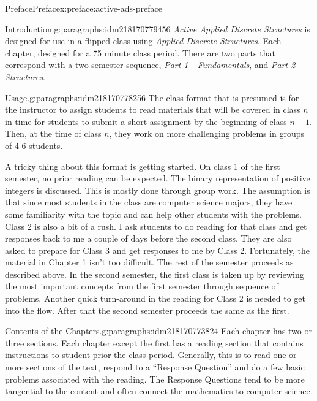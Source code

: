 \documentclass[oneside,10pt,]{book}
\numberwithin{equation}{section}
\begin{document}
\begin{preface}{Preface}{}{Preface}{}{}{x:preface:active-ads-preface}
\begin{paragraphs}{Introduction.}{g:paragraphs:idm218170779456}%
\emph{Active Applied Discrete Structures} is designed for use in a flipped class using \emph{Applied Discrete Structures}. Each chapter, designed for a 75 minute class period.  There are two parts that correspond with a two semester sequence, \emph{Part 1 - Fundamentals}, and \emph{Part 2 - Structures}.%
\end{paragraphs}%
\begin{paragraphs}{Usage.}{g:paragraphs:idm218170778256}%
The class format that is presumed is for the instructor to assign students to read materials that will be covered in class \(n\) in time for students to submit a short assignment by the beginning of class \(n-1\). Then, at the time of class \(n\), they work on more challenging problems in groups of 4-6 students.%
\par
A tricky thing about this format is getting started. On class 1 of the first semester, no prior reading can be expected. The binary representation of positive integers is discussed. This is mostly done through group work. The assumption is that since most students in the class are computer science majors, they have some familiarity with the topic and can help  other students with the problems. Class 2 is also a bit of a rush. I ask students to do reading for that class and get responses back to me a couple of days before the second class. They are also asked to prepare for Class 3 and get responses to me by Class 2.   Fortunately, the material in Chapter 1 isn't too difficult.  The rest of the semester proceeds as described above. In the second semester, the first class is taken up by reviewing the most important concepts from the first semester through sequence of problems. Another quick turn-around in the reading for Class 2 is needed to get into the flow.  After that the second semester proceeds the same as the first.%
\end{paragraphs}%
\begin{paragraphs}{Contents of the Chapters.}{g:paragraphs:idm218170773824}%
Each chapter has two or three sections.  Each chapter except the first has a reading section that contains instructions to student prior the class period. Generally, this is to read one or more sections of the text, respond to a ``Response Question'' and do a few basic problems associated with the reading.  The Response Questions tend to be more tangential to the content and often connect the mathematics to computer science.%

\end{paragraphs}
\end{preface}
\end{document}
